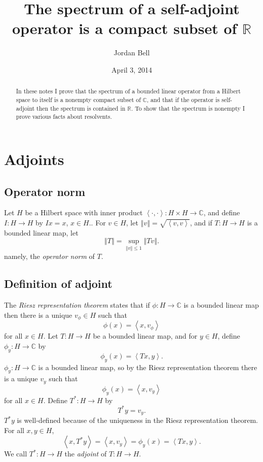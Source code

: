 \documentclass{article}
\newcommand{\inner}[2]{\left\langle #1, #2 \right\rangle}
\newcommand{\norm}[1]{\left\Vert #1 \right\Vert}
\begin{document}
\title{The spectrum of a self-adjoint operator is a compact subset of $\mathbb{R}$}
\author{Jordan Bell}
\date{April 3, 2014}
\maketitle
\begin{abstract}
In these notes I prove that the 
spectrum of a bounded linear operator from a Hilbert space to itself is a nonempty compact subset of $\mathbb{C}$,
and that if the operator is self-adjoint then the spectrum is contained in $\mathbb{R}$. To show that the spectrum is nonempty I prove
various facts about resolvents.
\end{abstract}


\section{Adjoints}
\subsection{Operator norm}
Let $H$ be a Hilbert space with inner product $\inner{\cdot}{\cdot}:H \times H \to \mathbb{C}$, and define $I:H \to H$ by $Ix=x$, $x \in H$..
For $v \in H$, let $\norm{v} = \sqrt{\inner{v}{v}}$, and if $T:H \to H$ is a bounded linear map, let
\[
\norm{T}=\sup_{\norm{v} \leq 1} \norm{Tv}.
\]
namely, the {\em operator norm} of $T$.

\subsection{Definition of adjoint}
The {\em Riesz representation theorem} states that if $\phi:H \to \mathbb{C}$ is a bounded linear map then there is a unique $v_\phi \in H$ such that 
\[
\phi(x)=\inner{x}{v_\phi}
\]
for all $x \in H$. Let $T:H \to H$ be a bounded linear map, and for $y \in H$, define $\phi_y:H \to \mathbb{C}$ by
\[
\phi_y(x)=\inner{Tx}{y}.
\]
$\phi_y:H \to \mathbb{C}$ is a bounded linear map,
so by the Riesz representation theorem there is a unique $v_y$ such that
\[
\phi_y(x)=\inner{x}{v_y}
\]
for all $x \in H$. Define $T^*:H \to H$ by
\[
T^*y=v_y.
\]
$T^*y$ is well-defined because
of the uniqueness in the Riesz representation theorem.
For all $x, y \in H$, 
\[
\inner{x}{T^*y}=\inner{x}{v_y}=\phi_y(x)=\inner{Tx}{y}.
\]
We call $T^*:H \to H$ the {\em adjoint} of $T:H \to H$. 
\end{document}
